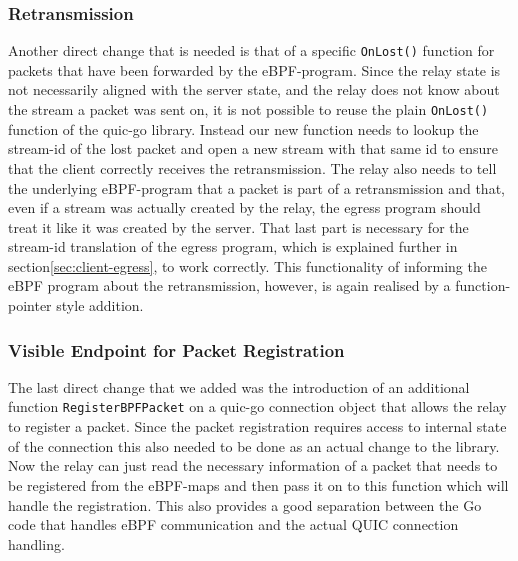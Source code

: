 \subsubsection*{Retransmission}
Another direct change that is needed is that of a specific \verb|OnLost()| function for packets that 
have been forwarded by the eBPF-program.
Since the relay state is not necessarily aligned with the server state, and the relay does not know
about the stream a packet was sent on, it is not possible to reuse the plain \verb|OnLost()| function
of the quic-go library.
Instead our new function needs to lookup the stream-id of the lost packet and open a new stream with
that same id to ensure that the client correctly receives the retransmission.
The relay also needs to tell the underlying eBPF-program that a packet is part of a retransmission and 
that, even if a stream was actually created by the relay, the egress program should treat it like it was
created by the server.
That last part is necessary for the stream-id translation of the egress program, which is explained further
in section\nobreakspace\ref{sec:client-egress}, to work correctly.
This functionality of informing the eBPF program about the retransmission, however, is again realised by a 
function-pointer style addition.

\subsubsection*{Visible Endpoint for Packet Registration}
The last direct change that we added was the introduction of an additional function \verb|RegisterBPFPacket| 
on a quic-go connection object that allows the relay to register a packet.
Since the packet registration requires access to internal state of the connection this also needed to be 
done as an actual change to the library.
Now the relay can just read the necessary information of a packet that needs to be registered
from the eBPF-maps and then pass it on to this function which will handle the registration.
This also provides a good separation between the Go code that handles eBPF communication and the actual
QUIC connection handling.